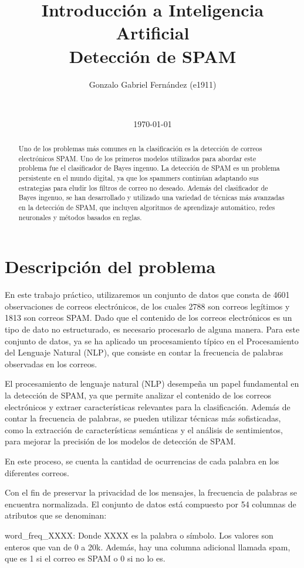 \documentclass[onecolumn]{IEEEtran}
\title{Introducción a Inteligencia Artificial\\Detección de SPAM}
\author{Gonzalo Gabriel Fernández (e1911)}
\author{\IEEEauthorblockN{Gonzalo Gabriel Fernandez\IEEEauthorrefmark{1},
Roberto Enrique Castro Beltran\IEEEauthorrefmark{2}}\\
\IEEEauthorblockA{Carrera de Especialización en Inteligencia Artificial\\
Universidad de Buenos Aires\\
Email: \IEEEauthorrefmark{1}fernandez.gfg@gmail.com,
\IEEEauthorrefmark{2}electrobot73@gmail.com}}
\date{\today}
\begin{document}
\maketitle

\begin{abstract}
Uno de los problemas más comunes en la clasificación es la detección de correos electrónicos SPAM. Uno de los primeros modelos utilizados para abordar este problema fue el clasificador de Bayes ingenuo. La detección de SPAM es un problema persistente en el mundo digital, ya que los spammers continúan adaptando sus estrategias para eludir los filtros de correo no deseado. Además del clasificador de Bayes ingenuo, se han desarrollado y utilizado una variedad de técnicas más avanzadas en la detección de SPAM, que incluyen algoritmos de aprendizaje automático, redes neuronales y métodos basados en reglas.
\end{abstract}

\section{Descripción del problema}
En este trabajo práctico, utilizaremos un conjunto de datos que consta de 4601 observaciones de correos electrónicos, de los cuales 2788 son correos legítimos y 1813 son correos SPAM. Dado que el contenido de los correos electrónicos es un tipo de dato no estructurado, es necesario procesarlo de alguna manera. Para este conjunto de datos, ya se ha aplicado un procesamiento típico en el Procesamiento del Lenguaje Natural (NLP), que consiste en contar la frecuencia de palabras observadas en los correos.

El procesamiento de lenguaje natural (NLP) desempeña un papel fundamental en la detección de SPAM, ya que permite analizar el contenido de los correos electrónicos y extraer características relevantes para la clasificación. Además de contar la frecuencia de palabras, se pueden utilizar técnicas más sofisticadas, como la extracción de características semánticas y el análisis de sentimientos, para mejorar la precisión de los modelos de detección de SPAM.

En este proceso, se cuenta la cantidad de ocurrencias de cada palabra en los diferentes correos.

Con el fin de preservar la privacidad de los mensajes, la frecuencia de palabras se encuentra normalizada. El conjunto de datos está compuesto por 54 columnas de atributos que se denominan:

word\_freq\_XXXX: Donde XXXX es la palabra o símbolo. Los valores son enteros que van de 0 a 20k.
Además, hay una columna adicional llamada spam, que es 1 si el correo es SPAM o 0 si no lo es.
\end{document}
